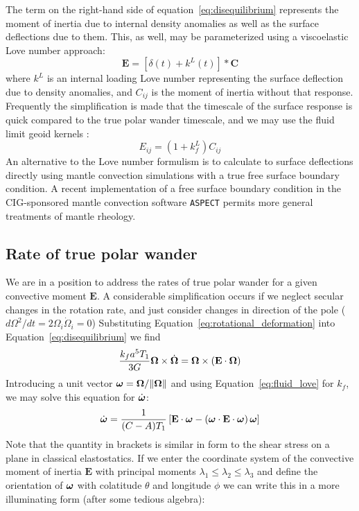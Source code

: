 \documentclass[extra,mreferee]{gji}
\newif\ifdetail
\begin{document}
The term on the right-hand side of equation~\eqref{eq:disequilibrium} represents the moment of inertia due to internal density anomalies as well as the surface deflections due to them.
This, as well, may be parameterized using a viscoelastic Love number approach:
\begin{equation} 
\mathbf{E} = \left[ \delta(t) + k^L(t) \right] * \mathbf{C}
\end{equation}
where $k^L$ is an internal loading Love number representing the surface deflection due to density anomalies, and $C_{ij}$ is the moment of inertia without that response.
Frequently the simplification is made that the timescale of the surface response is quick compared to the true polar wander timescale, and we may use the fluid limit geoid kernels \citep[e.g.][]{richards1984geoid}:  
\begin{equation}
E_{ij} = (1+k^L_f) C_{ij}
\end{equation}
An alternative to the Love number formulism is to calculate to surface deflections directly using mantle convection simulations with a true free surface boundary condition.
A recent implementation of a free surface boundary condition in the CIG-sponsored mantle convection software \texttt{ASPECT} \citep{rose2015free}
permits more general treatments of mantle rheology.

\subsection{Rate of true polar wander}
\label{sec:tpw_rate}

We are in a position to address the rates of true polar wander for a given convective moment $\mathbf{E}$.
A considerable simplification occurs if we neglect secular changes in the rotation rate, and just consider changes in direction of the pole ($d \Omega^2 / dt = 2 {\Omega_i} \dot{ \Omega}_i = 0$)
Substituting Equation~\eqref{eq:rotational_deformation} into Equation~\eqref{eq:disequilibrium} we find
\begin{equation}
\frac{k_f a^5 T_1}{3G}\mitbf{\Omega} \times \dot{\mitbf{\Omega} } = \mitbf{\Omega} \times \left( \mathbf{E} \cdot \mitbf{\Omega} \right)
\label{eq:liouville}
\end{equation}
Introducing a unit vector $\mitbf{\omega} = \mitbf{\Omega}/\|\mitbf{\Omega} \|$ and using Equation~\eqref{eq:fluid_love} for $k_f$,  we may solve this equation for $\dot{\mitbf{\omega}}$:
\begin{equation}
 \dot{\mitbf{\omega}}  = \frac{1}{(C-A)T_1} \left[ \mathbf{E} \cdot \mitbf{\omega} - \left( \mitbf{\omega} \cdot \mathbf{E} \cdot \mitbf{\omega}  \right) \mitbf{\omega} \right]
\label{eq:liouville_ode}
\end{equation}
Note that the quantity in brackets is similar in form to the shear stress on a plane in classical elastostatics.
If we enter the coordinate system of the convective moment of inertia $\mathbf{E}$ with principal moments $\lambda_1 \le \lambda_2 \le \lambda_3$ and define the orientation of $\mitbf{\omega}$ with colatitude $\theta$ and longitude $\phi$ we can write this in a more illuminating form (after some tedious algebra):
\ifdetail
\end{document}
